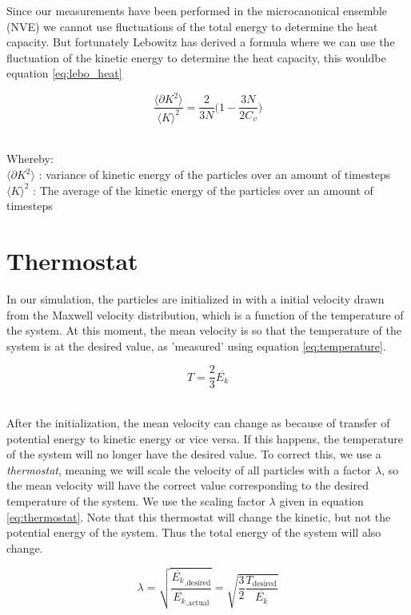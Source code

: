 \documentclass[12pt,a4paper]{report}
\begin{document}
Since our measurements have been performed in the microcanonical ensemble (NVE) we cannot use fluctuations of the total energy to determine the heat capacity. But fortunately Lebowitz\cite{lebowitz1967} has derived a formula where we can use the fluctuation of the kinetic energy to determine the heat capacity, this wouldbe equation \ref{eq:lebo_heat}

\begin{equation}\label{eq:lebo_heat}
\frac{\langle \partial K^2 \rangle}{\langle K \rangle^2}=\frac{2}{3N} \big( 1-\frac{3N}{2C_v}\big)
\end{equation}\

Whereby:\\
$\langle \partial K^2 \rangle$ : variance of kinetic energy of the particles over an amount of timesteps\\
$\langle K \rangle^2$ : The average of the kinetic energy of the particles over an amount of timesteps

\section{Thermostat}

In our simulation, the particles are initialized in with a initial velocity drawn from the Maxwell velocity distribution, which is a function of the temperature of the system. At this moment, the mean velocity is so that the temperature of the system is at the desired value, as 'measured' using equation \ref{eq:temperature}.

\begin{equation}\label{eq:temperature}
	T = \frac{2}{3} \overline{E_k}
\end{equation}\

After the initialization, the mean velocity can change as because of transfer of potential energy to kinetic energy or vice versa. If this happens, the temperature of the system will no longer have the desired value. To correct this, we use a \emph{thermostat}, meaning we will scale the velocity of all particles with a factor $\lambda$, so the mean velocity will have the correct value corresponding to the desired temperature of the system. We use the scaling factor $\lambda$ given in equation \ref{eq:thermostat}. Note that this thermostat will change the kinetic, but not the potential energy of the system. Thus the total energy of the system will also change.

\begin{equation}\label{eq:thermostat}
	\lambda = \sqrt{\frac{ \overline{E_{k}}_\text{,desired} }{ \overline{E_{k}}_\text{,actual} }} = \sqrt{\frac{3}{2} \frac{T_\text{desired}}{\overline{E_k}}}
\end{equation}
\end{document}
